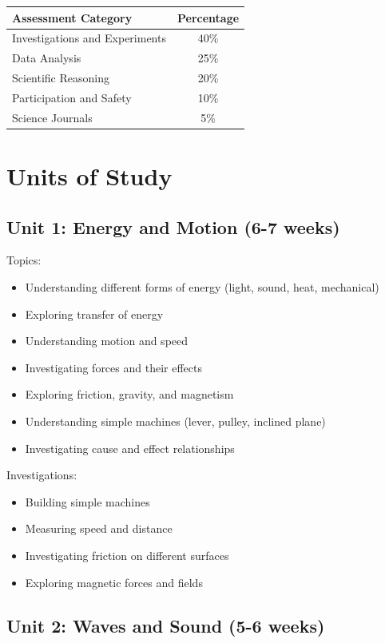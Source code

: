 \documentclass[11pt,letterpaper]{report}
\begin{document}
\begin{center}
\begin{tabular}{|l|c|}
\hline
\textbf{Assessment Category} & \textbf{Percentage} \\
\hline
Investigations and Experiments & 40\% \\
\hline
Data Analysis & 25\% \\
\hline
Scientific Reasoning & 20\% \\
\hline
Participation and Safety & 10\% \\
\hline
Science Journals & 5\% \\
\hline
\end{tabular}
\end{center}

\section{Units of Study}

\subsection{Unit 1: Energy and Motion (6-7 weeks)}

Topics:
\begin{itemize}
\item Understanding different forms of energy (light, sound, heat, mechanical)
\item Exploring transfer of energy
\item Understanding motion and speed
\item Investigating forces and their effects
\item Exploring friction, gravity, and magnetism
\item Understanding simple machines (lever, pulley, inclined plane)
\item Investigating cause and effect relationships
\end{itemize}

Investigations:
\begin{itemize}
\item Building simple machines
\item Measuring speed and distance
\item Investigating friction on different surfaces
\item Exploring magnetic forces and fields
\end{itemize}

\subsection{Unit 2: Waves and Sound (5-6 weeks)}
\end{document}
